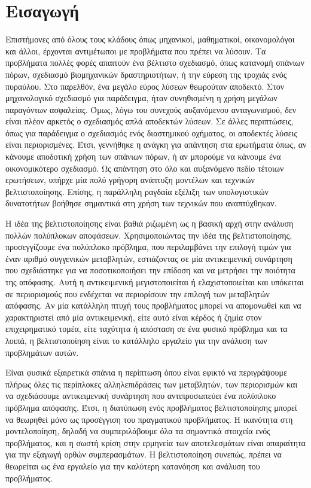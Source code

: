 \chapter{Εισαγωγή}
Επιστήμονες από όλους τους κλάδους όπως μηχανικοί, μαθηματικοί, οικονομολόγοι
και άλλοι, έρχονται αντιμέτωποι με προβλήματα που πρέπει να λύσουν. Τα
προβλήματα πολλές φορές απαιτούν ένα βέλτιστο σχεδιασμό, όπως κατανομή σπάνιων πόρων,
σχεδιασμό βιομηχανικών δραστηριοτήτων, ή την εύρεση της τροχιάς ενός πυραύλου.
Στο παρελθόν, ένα μεγάλο εύρος λύσεων θεωρούταν αποδεκτό. Στον μηχανολογικό
σχεδιασμό για παράδειγμα, ήταν συνηθισμένη η χρήση μεγάλων παραγόντων ασφαλείας.
Όμως, λόγω του συνεχούς αυξανόμενου ανταγωνισμού, δεν είναι πλέον αρκετός
ο σχεδιασμός απλά αποδεκτών λύσεων. Σε άλλες περιπτώσεις, όπως για παράδειγμα ο
σχεδιασμός ενός διαστημικού οχήματος, οι αποδεκτές λύσεις είναι περιορισμένες.
Έτσι, γεννήθηκε η ανάγκη για απάντηση στα ερωτήματα όπως, αν κάνουμε αποδοτική
χρήση των σπάνιων πόρων, ή αν μπορούμε να κάνουμε ένα οικονομικότερο σχεδιασμό.
Ως απάντηση στο όλο και αυξανόμενο πεδίο τέτοιων ερωτήσεων, υπήρχε μία πολύ
γρήγορη ανάπτυξη μοντέλων και τεχνικών βελτιστοποίησης. Επίσης, η παράλληλη
ραγδαία εξέλιξη των υπολογιστικών δυνατοτήτων βοήθησε σημαντικά στη χρήση των
τεχνικών που αναπτύχθηκαν.

Η ιδέα της βελτιστοποίησης είναι βαθιά ριζωμένη ως η βασική αρχή στην ανάλυση
πολλών πολύπλοκων αποφάσεων. Χρησιμοποιώντας την ιδέα της βελτιστοποίησης,
προσεγγίζουμε ένα πολύπλοκο πρόβλημα, που περιλαμβάνει την επιλογή τιμών για
έναν αριθμό συγγενικών μεταβλητών, εστιάζοντας σε μία αντικειμενική συνάρτηση
που σχεδιάστηκε για να ποσοτικοποιήσει την επίδοση και να μετρήσει την ποιότητα
της απόφασης. Αυτή η αντικειμενική μεγιστοποιείται ή ελαχιστοποιείται και
υπόκειται σε περιορισμούς που ενδέχεται να περιορίσουν την επιλογή των
μεταβλητών απόφασης. Αν μία κατάλληλη πτυχή τους προβλήματος μπορεί να
απομονωθεί και να χαρακτηριστεί από μία αντικειμενική, είτε αυτό είναι κέρδος ή
ζημία στον επιχειρηματικό τομέα, είτε ταχύτητα ή απόσταση σε ένα φυσικό πρόβλημα
και τα λοιπά, η βελτιστοποίηση είναι το κατάλληλο εργαλείο για την ανάλυση των
προβλημάτων αυτών.

Είναι φυσικά εξαιρετικά σπάνια η περίπτωση όπου είναι εφικτό να περιγράψουμε
πλήρως όλες τις περίπλοκες αλληλεπιδράσεις των μεταβλητών, των περιορισμών και
να σχεδιάσουμε αντικειμενική συνάρτηση που αντιπροσωπεύει ένα πολύπλοκο
πρόβλημα απόφασης. Έτσι, η διατύπωση ενός προβλήματος βελτιστοποίησης μπορεί να
θεωρηθεί μόνο ως προσέγγιση του πραγματικού προβλήματος. Η ικανότητα στη
μοντελοποίηση, δηλαδή να συμπεριλάβουμε όλα τα σημαντικά στοιχεία ενός προβλήματος, και
η σωστή κρίση στην ερμηνεία των αποτελεσμάτων είναι απαραίτητα για την εξαγωγή
ορθών συμπερασμάτων. Η βελτιστοποίηση συνεπώς, πρέπει να θεωρείται ως ένα
εργαλείο για την καλύτερη κατανόηση και ανάλυση του προβλήματος.

